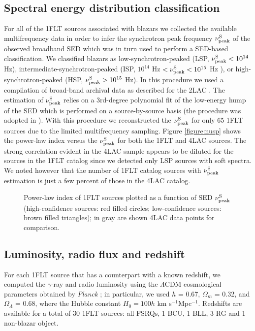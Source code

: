 \documentclass{aastex62}
\begin{document}
\subsection{Spectral energy distribution classification}
For all of the 1FLT sources associated with blazars we collected the available multifrequency data in order to infer the synchrotron peak frequency $\nu_{\rm peak}^{\rm S}$ of the observed broadband SED which was in turn used to perform a SED-based classification. 
We classified blazars as low-synchrotron-peaked (LSP, $\nu_{\rm peak}^{\rm S}<10^{14}$ Hz), intermediate-synchrotron-peaked (ISP, $10^{14}$ Hz $<\nu_{\rm peak}^{\rm S}<10^{15}$ Hz ), or high-synchrotron-peaked (HSP, $\nu_{\rm peak}^{\rm S}>10^{15}$ Hz). 
In this procedure we used a compilation of broad-band archival data as described for the 2LAC \citep{ackermann2011secondLAC}. 
The estimation of $\nu_{\rm peak}^{\rm S}$ relies on a 3rd-degree polynomial fit of the low-energy hump of the SED which is performed on a source-by-source basis (the procedure was adopted in \citealt{ackermann20153LAC}). With this procedure we reconstructed the $\nu_{\rm peak}^{\rm S}$ for only 65 1FLT sources due to the limited multifrequency sampling. 
Figure \ref{figure:nusp} shows the power-law index versus the $\nu_{\rm peak}^{\rm S}$ for both the 1FLT and 4LAC sources. 
The strong correlation evident in the 4LAC sample appears to be diluted for the sources in the 1FLT catalog since we detected only LSP sources with soft spectra. We noted however that the number of 1FLT catalog sources with $\nu_{\rm peak}^{\rm S}$ estimation is just a few percent of those in the 4LAC catalog.

\begin{figure}[hbt!]
 \caption{Power-law index of 1FLT sources plotted as a function of SED  $\nu_{\rm peak}^{\rm S}$ (high-confidence sources: red filled circles; low-confidence sources: brown filled triangles); in gray are shown 4LAC data points for comparison.}
\end{figure}\label{figure:nusp}

\subsection{Luminosity, radio flux and redshift}
For each 1FLT source that has a counterpart with a known redshift,  we computed the $\gamma$-ray and radio luminosity using the $\Lambda$CDM cosmological parameters obtained by \textit{Planck} \citep{2014A&A...571A..16P}; in  particular, we used $h$ = 0.67, $\Omega_m$ = 0.32, and $\Omega_{\Lambda}$ = 0.68, where the Hubble constant $H_0= 100h$ km s$^{-1}$Mpc$^{-1}$.
Redshifts are available for a total of 30 1FLT sources: all FSRQs, 1 BCU, 1 BLL, 3 RG and 1 non-blazar object.
\end{document}
